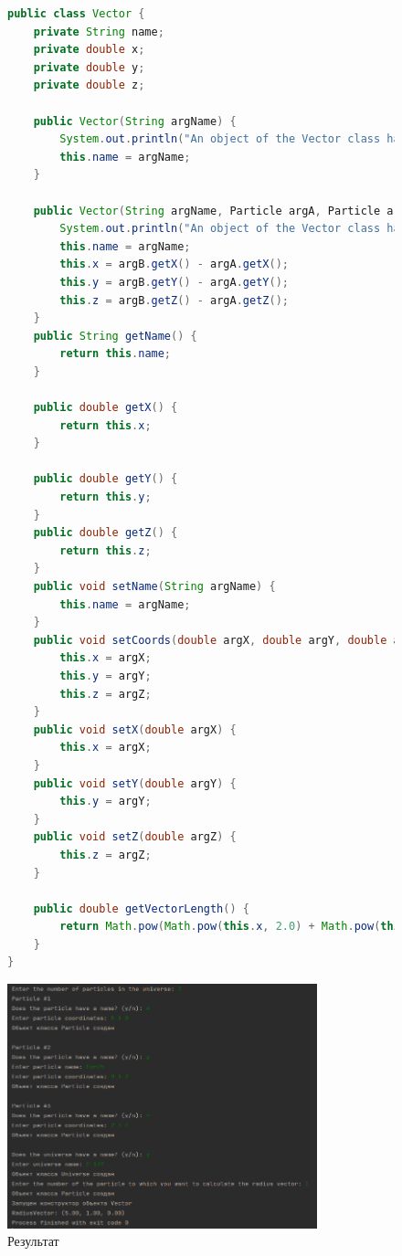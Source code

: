 \documentclass[a4paper, 14pt]{extarticle}
\begin{document}
\newpage

\begin{figure}[!htb]
\begin{lstlisting}[language=Java,caption={Класс Vector},label={lst:vector}]
public class Vector {
    private String name;
    private double x;
    private double y;
    private double z;

    public Vector(String argName) {
        System.out.println("An object of the Vector class has been created");
        this.name = argName;
    }

    public Vector(String argName, Particle argA, Particle argB) {
        System.out.println("An object of the Vector class has been created");
        this.name = argName;
        this.x = argB.getX() - argA.getX();
        this.y = argB.getY() - argA.getY();
        this.z = argB.getZ() - argA.getZ();
    }
    public String getName() {
        return this.name;
    }

    public double getX() {
        return this.x;
    }

    public double getY() {
        return this.y;
    }
    public double getZ() {
        return this.z;
    }
    public void setName(String argName) {
        this.name = argName;
    }
    public void setCoords(double argX, double argY, double argZ) {
        this.x = argX;
        this.y = argY;
        this.z = argZ;
    }
    public void setX(double argX) {
        this.x = argX;
    }
    public void setY(double argY) {
        this.y = argY;
    }
    public void setZ(double argZ) {
        this.z = argZ;
    }

    public double getVectorLength() {
        return Math.pow(Math.pow(this.x, 2.0) + Math.pow(this.y, 2.0) + Math.pow(this.z, 2.0), 0.5);
    }
}
\end{lstlisting}
\end{figure}


\begin{figure}[!htb]
	\centering
	\includegraphics[width=0.8\textwidth]{output.png}
\caption{Результат}
\label{fig:output}
\end{figure}
\end{document}
